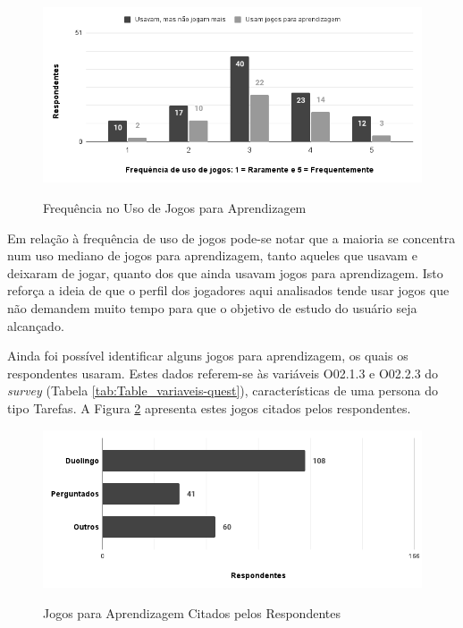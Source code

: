 \begin{figure}[htbp]
	\centering
	\caption{Frequência no Uso de Jogos para Aprendizagem}
	\includegraphics[keepaspectratio=true,scale=0.6]{figuras/resultados/freq-jogo.png}
	\label{Fig:freq-jogo.png}
\end{figure}

Em relação à frequência de uso de jogos pode-se notar que a maioria se concentra num uso mediano de jogos para aprendizagem, tanto aqueles que usavam e deixaram de jogar, quanto dos que ainda usavam jogos para aprendizagem. Isto reforça a ideia de que o perfil dos jogadores aqui analisados tende usar jogos que não demandem muito tempo para que o objetivo de estudo do usuário seja alcançado.

Ainda foi possível identificar alguns jogos para aprendizagem, os quais os respondentes usaram. Estes dados referem-se às variáveis O02.1.3 e O02.2.3 do \textit{survey} (Tabela \ref{tab:Table_variaveis-quest}), características de uma persona do tipo Tarefas. A Figura \ref{Fig:jogo-cit.png} apresenta estes jogos citados pelos respondentes. 

\begin{figure}[htbp]
	\centering
	\caption{Jogos para Aprendizagem Citados pelos Respondentes}
	\includegraphics[keepaspectratio=true,scale=0.6]{figuras/resultados/jogo-cit.png}
	\label{Fig:jogo-cit.png}
\end{figure}

